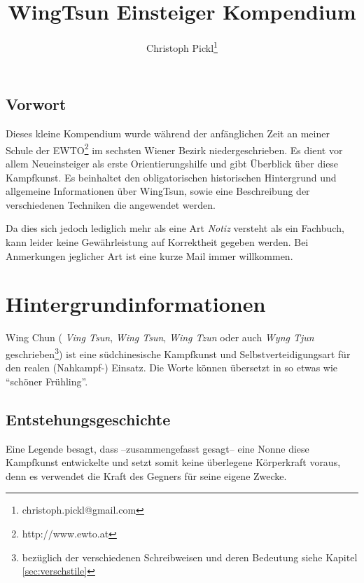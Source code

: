 \documentclass[a4paper,12pt]{scrartcl}
\title{WingTsun Einsteiger Kompendium}
\author{Christoph Pickl\footnote{christoph.pickl@gmail.com}}
\begin{document}
\maketitle

\subsection*{Vorwort}

Dieses kleine Kompendium wurde w\"ahrend der anf\"anglichen Zeit an meiner Schule der EWTO\footnote{http://www.ewto.at} im sechsten Wiener Bezirk niedergeschrieben. Es dient vor allem Neueinsteiger als erste Orientierungshilfe und gibt \"Uberblick \"uber diese Kampfkunst. Es beinhaltet den obligatorischen historischen Hintergrund und allgemeine Informationen \"uber WingTsun, sowie eine Beschreibung der verschiedenen Techniken die angewendet werden.

Da dies sich jedoch lediglich mehr als eine Art \textit{Notiz} versteht als ein Fachbuch, kann leider keine Gew\"ahrleistung auf Korrektheit gegeben werden. Bei Anmerkungen jeglicher Art ist eine kurze Mail immer willkommen.

\tableofcontents

\newpage

\section{Hintergrundinformationen}

Wing Chun ( \textit{Ving Tsun}, \textit{Wing Tsun}, \textit{Wing Tzun} oder auch \textit{Wyng Tjun} geschrieben\footnote{bez\"uglich der verschiedenen Schreibweisen und deren Bedeutung siehe Kapitel \ref{sec:verschstile}}) ist eine s\"udchinesische Kampfkunst und Selbstverteidigungsart  f\"ur den realen (Nahkampf-) Einsatz. Die Worte k\"onnen \"ubersetzt in so etwas wie ``sch\"oner Fr\"uhling''.

\subsection{Entstehungsgeschichte}

Eine Legende besagt, dass --zusammengefasst gesagt-- eine Nonne diese Kampfkunst entwickelte und setzt somit keine \"uberlegene K\"orperkraft voraus, denn es verwendet die Kraft des Gegners f\"ur seine eigene Zwecke.
\end{document}
